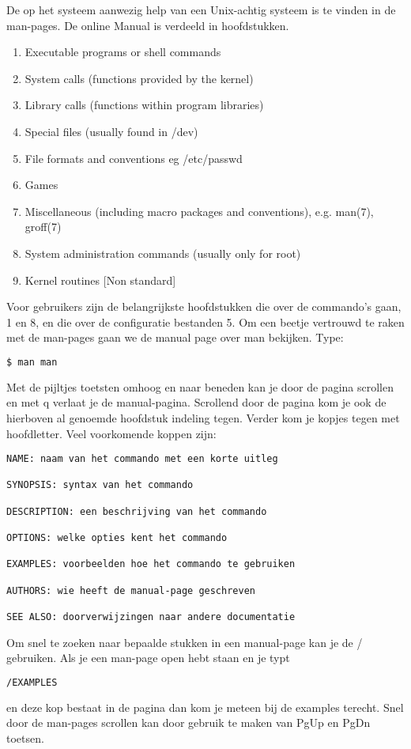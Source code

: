De op het systeem aanwezig help van een Unix-achtig systeem is te vinden in de man-pages. De online Manual is verdeeld
in hoofdstukken.

\begin{enumerate}
\item Executable programs or shell commands
\item System calls (functions provided by the kernel)
\item Library calls (functions within program libraries)
\item Special files (usually found in /dev)
\item File formats and conventions eg /etc/passwd
\item Games
\item Miscellaneous (including macro packages and conventions), e.g. man(7), groff(7)
\item System administration commands (usually only for root)
\item Kernel routines [Non standard]
\end{enumerate}

Voor gebruikers zijn de belangrijkste hoofdstukken die over de commando's gaan, 1 en 8, en die over de configuratie
bestanden 5. Om een beetje vertrouwd te raken met de man-pages gaan we de manual page over man bekijken. Type:

\begin{lstlisting}[language=bash]
$ man man
\end{lstlisting}

Met de pijltjes toetsten omhoog en naar beneden kan je door de pagina scrollen en met q verlaat je de manual-pagina.
Scrollend door de pagina kom je ook de hierboven al genoemde hoofdstuk indeling tegen. Verder kom je kopjes tegen met
hoofdletter. Veel voorkomende koppen zijn:

\begin{verbatim}
NAME: naam van het commando met een korte uitleg

SYNOPSIS: syntax van het commando

DESCRIPTION: een beschrijving van het commando

OPTIONS: welke opties kent het commando

EXAMPLES: voorbeelden hoe het commando te gebruiken

AUTHORS: wie heeft de manual-page geschreven

SEE ALSO: doorverwijzingen naar andere documentatie
\end{verbatim}

Om snel te zoeken naar bepaalde stukken in een manual-page kan je de / gebruiken. Als je een man-page open hebt staan en
je typt

\begin{lstlisting}[language=bash]
/EXAMPLES
\end{lstlisting}

en deze kop bestaat in de pagina dan kom je meteen bij de examples terecht. Snel door de man-pages scrollen kan door
gebruik te maken van PgUp en PgDn toetsen.

